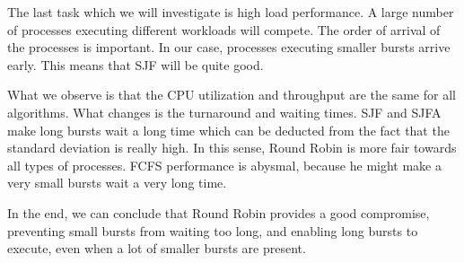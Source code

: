 \documentclass[11pt,a4paper]{scrartcl}
\begin{document}
The last task which we will investigate is high load performance. A large number of processes executing different workloads will compete. The order of arrival of the processes is important. In our case, processes executing smaller bursts arrive early. This means that SJF will be quite good.

What we observe is that the CPU utilization and throughput are the same for all algorithms. What changes is the turnaround and waiting times. SJF and SJFA make long bursts wait a long time which can be deducted from the fact that the standard deviation is really high. In this sense, Round Robin is more fair towards all types of processes. FCFS performance is abysmal, because he might make a very small bursts wait a very long time.

In the end, we can conclude that Round Robin provides a good compromise, preventing small bursts from waiting too long, and enabling long bursts to execute, even when a lot of smaller bursts are present.


\end{document}
